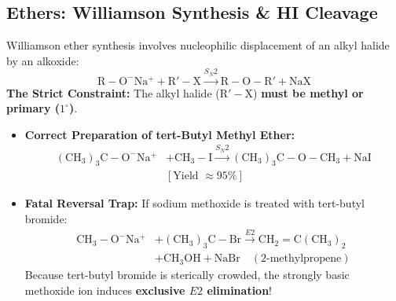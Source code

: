\documentclass[10pt,twoside,openright]{book}
\begin{document}
\subsection{Ethers: Williamson Synthesis \& HI Cleavage}

\begin{trapbox}
Williamson ether synthesis involves nucleophilic displacement of an alkyl halide by an alkoxide:
\begin{equation}
  \mathrm{R-O^-Na^+} + \mathrm{R'-X} \xrightarrow{S_N2} \mathrm{R-O-R'} + \mathrm{NaX}
\end{equation}
\textbf{The Strict Constraint:} The alkyl halide ($\mathrm{R'-X}$) \textbf{must be methyl or primary ($1^\circ$)}.
\begin{itemize}
  \item \textbf{Correct Preparation of tert-Butyl Methyl Ether:}
  \begin{align}
    \mathrm{(CH_3)_3C-O^-Na^+} &+ \mathrm{CH_3-I} \xrightarrow{S_N2} \mathbf{\mathrm{(CH_3)_3C-O-CH_3}} + \mathrm{NaI} \\
    &[\text{Yield } \approx 95\%]
  \end{align}
  \item \textbf{Fatal Reversal Trap:} If sodium methoxide is treated with tert-butyl bromide:
  \begin{align}
    \mathrm{CH_3-O^-Na^+} &+ \mathrm{(CH_3)_3C-Br} \xrightarrow{E2} \mathbf{\mathrm{CH_2=C(CH_3)_2}} \\
    &+ \mathrm{CH_3OH} + \mathrm{NaBr} \quad (\text{2-methylpropene})
  \end{align}
  Because tert-butyl bromide is sterically crowded, the strongly basic methoxide ion induces \textbf{exclusive $E2$ elimination}!
\end{itemize}
\end{trapbox}
\end{document}
